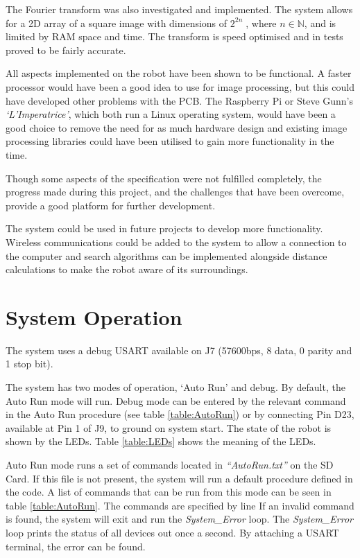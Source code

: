 The Fourier transform was also investigated and implemented. The system allows for a 2D array of a square image with dimensions of $2^{2n}\; $, where $n \in \mathbb{N}$, and is limited by RAM space and time. The transform is speed optimised and in tests proved to be fairly accurate. 

All aspects implemented on the robot have been shown to be functional. A faster processor would have been a good idea to use for image processing, but this could have developed other problems with the PCB. The Raspberry Pi or Steve Gunn's \textit{`L'Imperatrice'}, which both run a Linux operating system, would have been a good choice to remove the need for as much hardware design and existing image processing libraries could have been utilised to gain more functionality in the time. 

Though some aspects of the specification were not fulfilled completely, the progress made during this project, and the challenges that have been overcome, provide a good platform for further development.

The system could be used in future projects to develop more functionality. Wireless communications could be added to the system to allow a connection to the computer and search algorithms can be implemented alongside distance calculations to make the robot aware of its surroundings. 

\section{System Operation}

The system uses a debug USART available on J7 (57600bps, 8 data, 0 parity and 1 stop bit).

The system has two modes of operation, `Auto Run' and debug. By default, the Auto Run mode will run. Debug mode can be entered by the relevant command in the Auto Run procedure (see table \ref{table:AutoRun}) or by connecting Pin D23, available at Pin 1 of J9, to ground on system start. The state of the robot is shown by the LEDs. Table \ref{table:LEDs} shows the meaning of the LEDs.

Auto Run mode runs a set of commands located in \textit{``AutoRun.txt''} on the SD Card. If this file is not present, the system will run a default procedure defined in the code. A list of commands that can be run from this mode can be seen in table \ref{table:AutoRun}. The commands are specified by line If an invalid command is found, the system will exit and run the \textit{System\_Error} loop. The  \textit{System\_Error} loop prints the status of all devices out once a second. By attaching a USART terminal, the error can be found.

